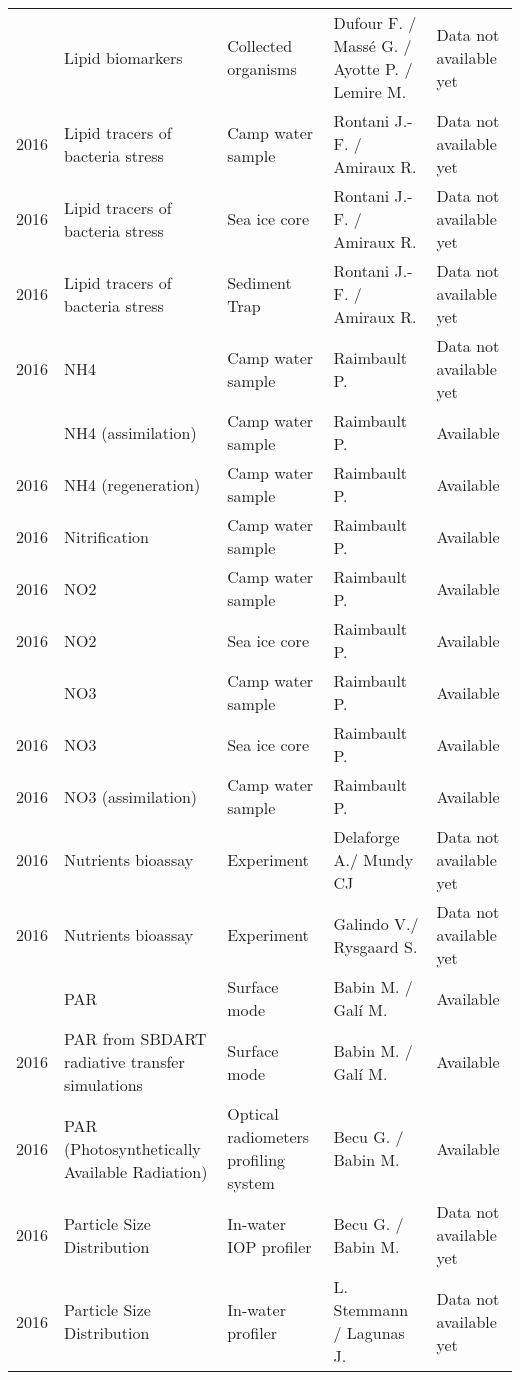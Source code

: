 \documentclass[]{article}
\begin{document}
\begin{landscape}
\begin{longtable}{rllll}
\addlinespace
2016 & Lipid biomarkers & Collected organisms & Dufour F. / Massé G. / Ayotte P. / Lemire M. & Data not available yet\\
2016 & Lipid tracers of bacteria stress & Camp water sample & Rontani J.-F. / Amiraux R. & Data not available yet\\
2016 & Lipid tracers of bacteria stress & Sea ice core & Rontani J.-F. / Amiraux R. & Data not available yet\\
2016 & Lipid tracers of bacteria stress & Sediment Trap & Rontani J.-F. / Amiraux R. & Data not available yet\\
2016 & NH4 & Camp water sample & Raimbault P. & Data not available yet\\
\addlinespace
2016 & NH4 (assimilation) & Camp water sample & Raimbault P. & Available\\
2016 & NH4 (regeneration) & Camp water sample & Raimbault P. & Available\\
2016 & Nitrification & Camp water sample & Raimbault P. & Available\\
2016 & NO2 & Camp water sample & Raimbault P. & Available\\
2016 & NO2 & Sea ice core & Raimbault P. & Available\\
\addlinespace
2016 & NO3 & Camp water sample & Raimbault P. & Available\\
2016 & NO3 & Sea ice core & Raimbault P. & Available\\
2016 & NO3 (assimilation) & Camp water sample & Raimbault P. & Available\\
2016 & Nutrients bioassay & Experiment & Delaforge A./ Mundy CJ & Data not available yet\\
2016 & Nutrients bioassay & Experiment & Galindo V./ Rysgaard S. & Data not available yet\\
\addlinespace
2016 & PAR & Surface mode & Babin M. / Galí M. & Available\\
2016 & PAR from SBDART radiative transfer simulations & Surface mode & Babin M. / Galí M. & Available\\
2016 & PAR (Photosynthetically Available Radiation) & Optical radiometers profiling system & Becu G. / Babin M. & Available\\
2016 & Particle Size Distribution & In-water IOP profiler & Becu G. / Babin M. & Data not available yet\\
2016 & Particle Size Distribution & In-water profiler & L. Stemmann / Lagunas J. & Data not available yet\\

\end{longtable}
\end{landscape}
\end{document}
